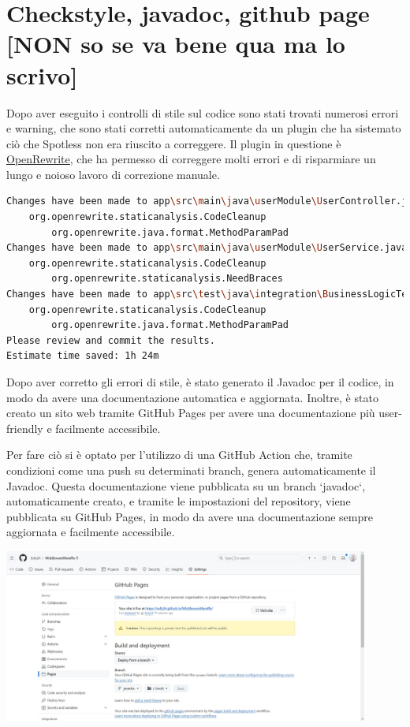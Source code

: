 \section{Checkstyle, javadoc, github page [NON so se va bene qua ma lo scrivo] }

Dopo aver eseguito i controlli di stile sul codice sono stati trovati numerosi errori e warning, che sono stati corretti automaticamente da un plugin che ha sistemato ciò che Spotless non era riuscito a correggere. Il plugin in questione è \href{https://github.com/openrewrite/rewrite}{\underline{OpenRewrite}}, che ha permesso di correggere molti errori e di risparmiare un lungo e noioso lavoro di correzione manuale.

\begin{lstlisting}[language=Bash, caption={Output di OpenRewrite}, label=list:openrewrite]
Changes have been made to app\src\main\java\userModule\UserController.java by:
    org.openrewrite.staticanalysis.CodeCleanup
        org.openrewrite.java.format.MethodParamPad
Changes have been made to app\src\main\java\userModule\UserService.java by:
    org.openrewrite.staticanalysis.CodeCleanup
        org.openrewrite.staticanalysis.NeedBraces
Changes have been made to app\src\test\java\integration\BusinessLogicTestIntegration.java by:
    org.openrewrite.staticanalysis.CodeCleanup
        org.openrewrite.java.format.MethodParamPad
Please review and commit the results.
Estimate time saved: 1h 24m 
\end{lstlisting}

Dopo aver corretto gli errori di stile, è stato generato il Javadoc per il codice, in modo da avere una documentazione automatica e aggiornata. Inoltre, è stato creato un sito web tramite GitHub Pages per avere una documentazione più user-friendly e facilmente accessibile. 

Per fare ciò si è optato per l'utilizzo di una GitHub Action che, tramite condizioni come una push su determinati branch, genera automaticamente il Javadoc. Questa documentazione viene pubblicata su un branch `javadoc`, automaticamente creato, e tramite le impostazioni del repository, viene pubblicata su GitHub Pages, in modo da avere una documentazione sempre aggiornata e facilmente accessibile.

\includegraphics[width=12cm]{report/img/github_javadoc.jpg}\\[1.5cm]


